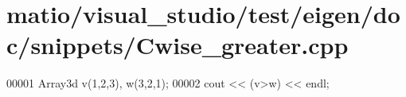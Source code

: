 \hypertarget{matio_2visual__studio_2test_2eigen_2doc_2snippets_2_cwise__greater_8cpp_source}{}\section{matio/visual\+\_\+studio/test/eigen/doc/snippets/\+Cwise\+\_\+greater.cpp}
\label{matio_2visual__studio_2test_2eigen_2doc_2snippets_2_cwise__greater_8cpp_source}

\begin{DoxyCode}
00001 Array3d v(1,2,3), w(3,2,1);
00002 cout << (v>w) << endl;
\end{DoxyCode}
